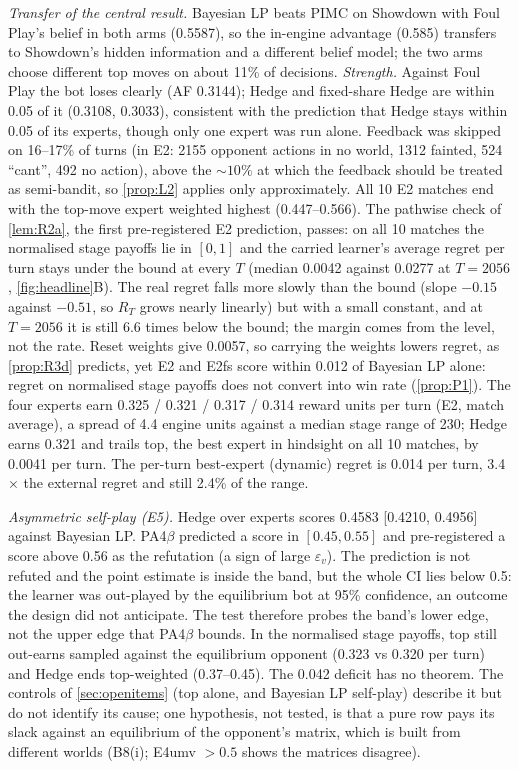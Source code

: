 \documentclass[10pt]{article}
\theoremstyle{plain}
\theoremstyle{definition}
\theoremstyle{remark}
\newcommand{\epsv}{\varepsilon_v}
\begin{document}
\emph{Transfer of the central result.} Bayesian LP beats PIMC on Showdown with Foul Play's belief in both arms (0.5587),
so the in-engine advantage (0.585) transfers to Showdown's hidden information and a different belief model; the two
arms choose different top moves on about 11\% of decisions. \emph{Strength.} Against Foul Play the bot loses
clearly (AF 0.3144); Hedge and fixed-share Hedge are within 0.05 of it (0.3108, 0.3033), consistent with the prediction
that Hedge stays within 0.05 of its experts, though only one expert was run alone. Feedback was skipped on 16--17\% of
turns (in E2: 2155 opponent actions in no world, 1312 fainted, 524 ``cant'', 492 no action), above the $\sim10\%$ at which
the feedback should be treated as semi-bandit, so \cref{prop:L2} applies only approximately. All 10 E2 matches end with
the top-move expert weighted highest (0.447--0.566). The pathwise check of \cref{lem:R2a}, the first pre-registered E2
prediction, passes: on all 10 matches the normalised stage payoffs lie in $[0,1]$ and the carried learner's average regret per
turn stays under the bound at every $T$ (median 0.0042 against 0.0277 at $T=2056$, \cref{fig:headline}B). The real
regret falls more slowly than the bound (slope $-0.15$ against $-0.51$, so $R_T$ grows nearly linearly) but with a small
constant, and at $T=2056$ it is still 6.6 times below the bound; the margin comes from the level, not the rate. Reset weights give
0.0057, so carrying the weights lowers regret, as \cref{prop:R3d} predicts, yet E2 and E2fs score within 0.012 of Bayesian LP
alone: regret on normalised stage payoffs does not convert into win rate (\cref{prop:P1}). The four experts earn 0.325 / 0.321 /
0.317 / 0.314 reward units per turn (E2, match average), a spread of 4.4 engine units against a median stage range of 230;
Hedge earns 0.321 and trails top, the best expert in hindsight on all 10 matches, by 0.0041 per turn. The per-turn
best-expert (dynamic) regret is 0.014 per turn, 3.4$\times$ the external regret and still 2.4\% of the range.

\emph{Asymmetric self-play (E5).} Hedge over experts scores 0.4583 [0.4210, 0.4956] against Bayesian LP. PA4$\beta$
predicted a score in $[0.45,0.55]$ and pre-registered a score above 0.56 as the refutation (a sign of large $\epsv$).
The prediction is not refuted and the point estimate is inside the band, but the whole CI lies below 0.5: the learner
was out-played by the equilibrium bot at 95\% confidence, an outcome the design did not anticipate. The test therefore
probes the band's lower edge, not the upper edge that PA4$\beta$ bounds. In the normalised stage payoffs, top still out-earns
sampled against the equilibrium opponent (0.323 vs 0.320 per turn) and Hedge ends top-weighted (0.37--0.45). The
0.042 deficit has no theorem. The controls of \cref{sec:openitems} (top alone, and Bayesian LP self-play) describe it
but do not identify its cause; one hypothesis, not tested, is that a pure row pays its slack against an equilibrium of
the opponent's matrix, which is built from different worlds (B8(i); E4umv $>0.5$ shows the matrices disagree).
\end{document}
